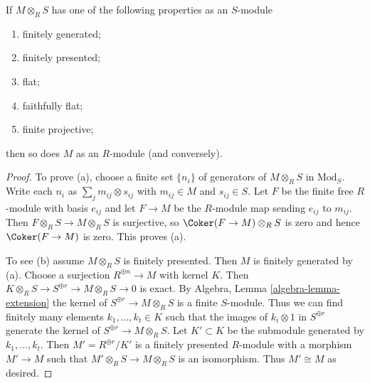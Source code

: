 \begin{theorem}
\label{theorem-descend-module-properties}
If $M \otimes_R S$ has one of the following properties as an $S$-module
\begin{enumerate}
\item[(a)]
finitely generated;
\item[(b)]
finitely presented;
\item[(c)]
flat;
\item[(d)]
faithfully flat;
\item[(e)]
finite projective;
\end{enumerate}
then so does $M$ as an $R$-module (and conversely).
\end{theorem}

\begin{proof}
To prove (a), choose a finite set $\{n_i\}$ of generators of $M \otimes_R S$
in $\text{Mod}_S$. Write each $n_i$ as $\sum_j m_{ij} \otimes s_{ij}$ with
$m_{ij} \in M$ and $s_{ij} \in S$. Let $F$ be the finite free $R$-module with
basis $e_{ij}$ and let $F \to M$ be the $R$-module map sending $e_{ij}$ to
$m_{ij}$. Then $F \otimes_R S\to M \otimes_R S$ is surjective, so
$\Coker(F \to M) \otimes_R S$ is zero and hence $\Coker(F \to M)$
is zero. This proves (a).

\medskip\noindent
To see (b) assume $M \otimes_R S$ is finitely presented. Then $M$ is finitely
generated by (a). Choose a surjection $R^{\oplus n} \to M$ with kernel $K$.
Then $K \otimes_R S \to S^{\oplus r} \to M \otimes_R S \to 0$ is exact.
By Algebra, Lemma \ref{algebra-lemma-extension}
the kernel of $S^{\oplus r} \to M \otimes_R S$
is a finite $S$-module. Thus we can find finitely many elements
$k_1, \ldots, k_t \in K$ such that the images of $k_i \otimes 1$ in
$S^{\oplus r}$ generate the kernel of $S^{\oplus r} \to M \otimes_R S$.
Let $K' \subset K$ be the submodule generated by $k_1, \ldots, k_t$.
Then $M' = R^{\oplus r}/K'$ is a finitely presented $R$-module
with a morphism $M' \to M$ such that $M' \otimes_R S \to M \otimes_R S$
is an isomorphism. Thus $M' \cong M$ as desired.


\end{proof}
